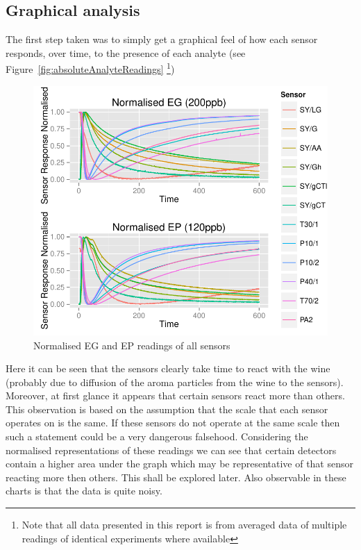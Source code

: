 \documentclass[twocolumn]{article}
\begin{document}
\subsection{Graphical analysis}
The first step taken was to simply get a graphical feel of 
how each sensor responds, over time, to the presence of each analyte (see Figure~\ref{fig:absoluteAnalyteReadings}
\footnote{Note that all data presented in this report is from averaged data of multiple readings of identical
experiments where available})

\begin{figure}[h!]
	\includegraphics[trim = 0mm 0mm 0mm 0mm, clip, scale=0.55]{normalisedEGEPreadings.pdf}
	\caption{Normalised EG and EP readings of all sensors}
	\label{fig:normalisedAnalyteReadings}
\end{figure}
Here it can be seen that the sensors clearly take time to react with the wine (probably due to
diffusion of the aroma particles from the wine to the sensors). Moreover, at first glance it appears that
certain sensors react more than others. This observation is based on the assumption that the scale that
each sensor operates on is the same. If these sensors do not operate at the same scale then such a statement
could be a very dangerous falsehood. Considering the normalised representations of these readings we can
see that certain detectors contain a higher area under the graph which may be representative of that sensor
reacting more then others. This shall be explored later. Also observable in these charts is that the data is quite noisy. 
\end{document}
